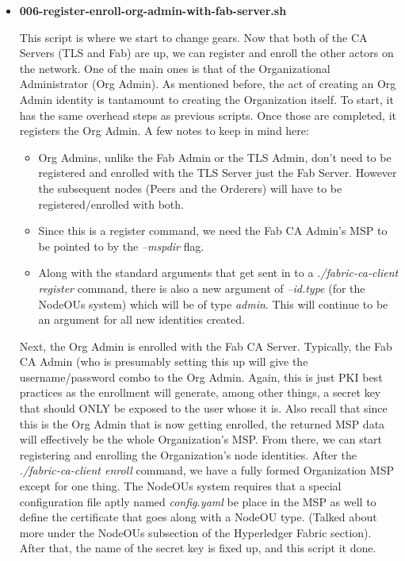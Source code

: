 \begin{itemize}
				\item \textbf{006-register-enroll-org-admin-with-fab-server.sh}
				
					\hspace{10mm}This script is where we start to change gears. Now that both of the CA Servers (TLS and Fab) are up, we can register and enroll the other actors on the network. One of the main ones is that of the Organizational Administrator (Org Admin). As mentioned before, the act of creating an Org Admin identity is tantamount to creating the Organization itself. To start, it has the same overhead steps as previous scripts. Once those are completed, it registers the Org Admin. A few notes to keep in mind here:
					
					\begin{itemize}
						\item Org Admins, unlike the Fab Admin or the TLS Admin, don't need to be registered and enrolled with the TLS Server just the Fab Server. However the subsequent nodes (Peers and the Orderers) will have to be registered/enrolled with both.
						\item Since this is a register command, we need the Fab CA Admin's MSP to be pointed to by the \textit{--mspdir} flag.
						\item Along with the standard arguments that get sent in to a \textit{./fabric-ca-client register} command, there is also a new argument of \textit{--id.type} (for the NodeOUs system) which will be of type \textit{admin}. This will continue to be an argument for all new identities created.
					\end{itemize}
					
					\hspace{10mm}Next, the Org Admin is enrolled with the Fab CA Server. Typically, the Fab CA Admin (who is presumably setting this up will give the username/password combo to the Org Admin. Again, this is just PKI best practices as the enrollment will generate, among other things, a secret key that should ONLY be exposed to the user whose it is. Also recall that since this is the Org Admin that is now getting enrolled, the returned MSP data will effectively be the whole Organization's MSP. From there, we can start registering and enrolling the Organization's node identities. After the \textit{./fabric-ca-client enroll} command, we have a fully formed Organization MSP except for one thing. The NodeOUs system requires that a special configuration file aptly named \textit{config.yaml} be place in the MSP as well to define the certificate that goes along with a NodeOU type. (Talked about more under the NodeOUs subsection of the Hyperledger Fabric section). After that, the name of the secret key is fixed up, and this script it done.
					

\end{itemize}
